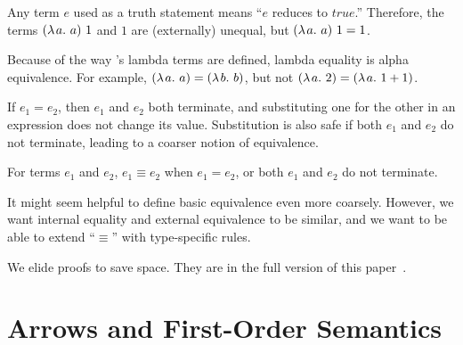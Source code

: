 \documentclass{llncs}
\begin{document}
Any \lzfclang term $\mathit{e}$ used as a truth statement means ``$\mathit{e}$ reduces to $true$.''
Therefore, the terms $(\lambda\mspace{2mu}{a}\ldotp\,{a})~1$ and $1$ are (externally) unequal, but $(\lambda\mspace{2mu}{a}\ldotp\,{a})~1 = 1$.

Because of the way \lzfclang's lambda terms are defined, lambda equality is alpha equivalence.
For example, $(\lambda\mspace{2mu}{a}\ldotp\,{a}) = (\lambda\mspace{2mu}{b}\ldotp\,{b})$, but not $(\lambda\mspace{2mu}{a}\ldotp\,{2}) = (\lambda\mspace{2mu}{a}\ldotp\,{1+1})$.

If $\mathit{e}_1 = \mathit{e}_2$, then $\mathit{e}_1$ and $\mathit{e}_2$ both terminate, and substituting one for the other in an expression does not change its value.
Substitution is also safe if both $\mathit{e}_1$ and $\mathit{e}_2$ do not terminate, leading to a coarser notion of equivalence.

\begin{definition}
For terms $\mathit{e_1}$ and $\mathit{e_2}$, $\mathit{e_1} \equiv \mathit{e_2}$ when $\mathit{e_1} = \mathit{e_2}$, or both $\mathit{e_1}$ and $\mathit{e_2}$ do not terminate.
\end{definition}

It might seem helpful to define basic equivalence even more coarsely.
However, we want internal equality and external equivalence to be similar, and we want to be able to extend ``$\equiv$'' with type-specific rules.

We elide proofs to save space.
They are in the full version of this paper~\cite{cit:toronto-2014esop-long}.



\section{Arrows and First-Order Semantics}
\end{document}
